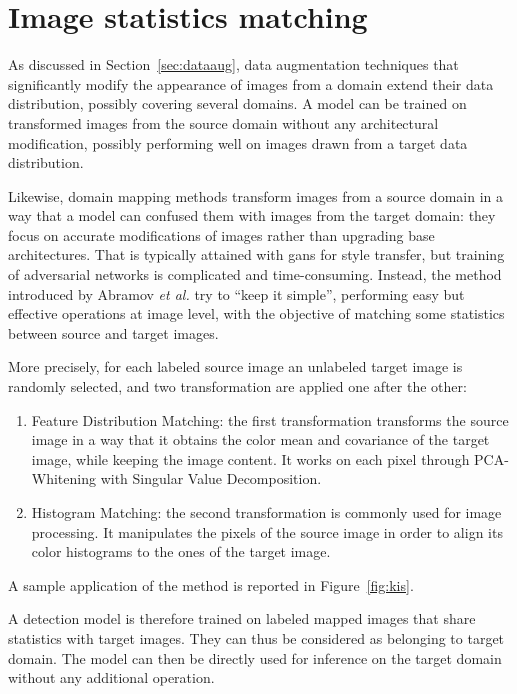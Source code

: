 \documentclass[%
    corpo=12pt,
    twoside,
    stile=classica,   
    tipotesi=magistrale,
    evenboxes,
    english,
	numerazioneromana,
]{toptesi}
\begin{document}
\section{Image statistics matching}
As discussed in Section~\ref{sec:dataaug}, data augmentation techniques that significantly modify the appearance of images from a domain extend their data distribution, possibly covering several domains. A model can be trained on transformed images from the source domain without any architectural modification, possibly performing well on images drawn from a target data distribution.

\bigskip
Likewise, domain mapping methods transform images from a source domain in a way that a model can confused them with images from the target domain: they focus on accurate modifications of images rather than upgrading base architectures. That is typically attained with \glspl{gan} for style transfer, but training of adversarial networks is complicated and time-consuming. Instead, the method introduced by Abramov \textit{et al.}\cite{abramov2020simple} try to \textquotedblleft keep it simple\textquotedblright, performing easy but effective operations at image level, with the objective of matching some statistics between source and target images.

More precisely, for each labeled source image an unlabeled target image is randomly selected, and two transformation are applied one after the other:
\begin{enumerate}
	\item Feature Distribution Matching: the first transformation transforms the source image in a way that it obtains the color mean and covariance of the target image, while keeping the image content. It works on each pixel through PCA-Whitening with Singular Value Decomposition.
	\item Histogram Matching: the second transformation is commonly used for image processing. It manipulates the pixels of the source image in order to align its color histograms to the ones of the target image.
\end{enumerate}

A sample application of the method is reported in Figure~\ref{fig:kis}.

A detection model is therefore trained on labeled mapped images that share statistics with target images. They can thus be considered as belonging to target domain. The model can then be directly used for inference on the target domain without any additional operation.
\end{document}
